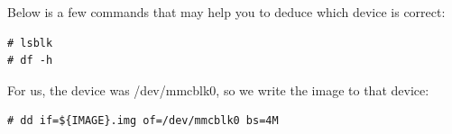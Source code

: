 Below is a few commands that may help you to deduce which device is correct:

\begin{lstlisting}[]
# lsblk
# df -h
\end{lstlisting}
\FloatBarrier

For us, the device was /dev/mmcblk0, so we write the image to that device:
\begin{lstlisting}[]
# dd if=${IMAGE}.img of=/dev/mmcblk0 bs=4M
\end{lstlisting}
\FloatBarrier


